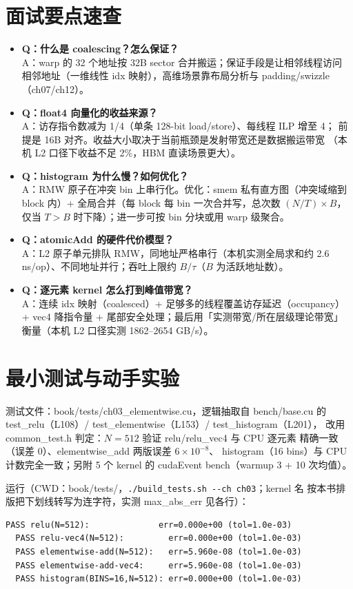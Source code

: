 \section{面试要点速查}

\begin{itemize}
\item \textbf{Q：什么是 coalescing？怎么保证？}\\
  A：warp 的 32 个地址按 32B sector 合并搬运；保证手段是让相邻线程访问
  相邻地址（一维线性 idx 映射），高维场景靠布局分析与 padding/swizzle
  （ch07/ch12）。
\item \textbf{Q：float4 向量化的收益来源？}\\
  A：访存指令数减为 1/4（单条 128-bit load/store）、每线程 ILP 增至 4；
  前提是 16B 对齐。收益大小取决于当前瓶颈是发射带宽还是数据搬运带宽
  （本机 L2 口径下收益不足 2\%，HBM 直读场景更大）。
\item \textbf{Q：histogram 为什么慢？如何优化？}\\
  A：RMW 原子在冲突 bin 上串行化。优化：smem 私有直方图（冲突域缩到
  block 内）+ 全局合并（每 block 每 bin 一次合并写，总次数 $(N/T) \times B$，
  仅当 $T > B$ 时下降）；进一步可按 bin 分块或用 warp 级聚合。
\item \textbf{Q：atomicAdd 的硬件代价模型？}\\
  A：L2 原子单元排队 RMW，同地址严格串行（本机实测全局求和约
  2.6 ns/op）、不同地址并行；吞吐上限约 $B/\tau$（$B$ 为活跃地址数）。
\item \textbf{Q：逐元素 kernel 怎么打到峰值带宽？}\\
  A：连续 idx 映射（coalesced）+ 足够多的线程覆盖访存延迟（occupancy）
  + vec4 降指令量 + 尾部安全处理；最后用「实测带宽/所在层级理论带宽」
  衡量（本机 L2 口径实测 1862--2654 GB/s）。
\end{itemize}

\section{最小测试与动手实验}

测试文件：book/tests/ch03\_elementwise.cu，逻辑抽取自 bench/base.cu 的
test\_relu（L108）/ test\_elementwise（L153）/ test\_histogram（L201），
改用 common\_test.h 判定：$N = 512$ 验证 relu/relu\_vec4 与 CPU 逐元素
精确一致（误差 0）、elementwise\_add 两版误差 $6 \times 10^{-8}$、
histogram（16 bins）与 CPU 计数完全一致；另附 5 个 kernel 的 cudaEvent
bench（warmup 3 + 10 次均值）。

运行（CWD：book/tests/，\texttt{.\allowbreak{}/\allowbreak{}build\_\allowbreak{}tests.\allowbreak{}sh -{}-ch ch03}；kernel 名
按本书排版把下划线转写为连字符，实测 max\_abs\_err 见各行）：
\begin{lstlisting}[style=console]
  PASS relu(N=512):              err=0.000e+00 (tol=1.0e-03)
  PASS relu-vec4(N=512):         err=0.000e+00 (tol=1.0e-03)
  PASS elementwise-add(N=512):   err=5.960e-08 (tol=1.0e-03)
  PASS elementwise-add-vec4:     err=5.960e-08 (tol=1.0e-03)
  PASS histogram(BINS=16,N=512): err=0.000e+00 (tol=1.0e-03)
\end{lstlisting}

